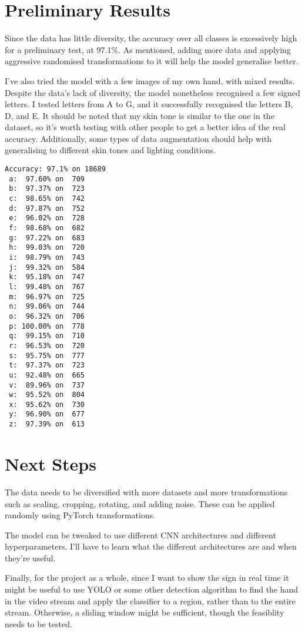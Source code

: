 \documentclass[12pt]{article}
\begin{document}
\section{Preliminary Results}

Since the data has little diversity, the accuracy over all classes is
excessively high for a preliminary test, at 97.1\%. As mentioned, adding
more data and applying aggressive randomised transformations to it will
help the model generalise better.

I've also tried the model with a few images of my own hand, with mixed
results. Despite the data's lack of diversity, the model nonetheless
recognised a few signed letters. I tested letters from A to G, and it
successfully recognised the letters B, D, and E. It should be noted that
my skin tone is similar to the one in the dataset, so it's worth testing
with other people to get a better idea of the real accuracy.
Additionally, some types of data augmentation should help with
generalising to different skin tones and lighting conditions.

\begin{verbatim}
Accuracy: 97.1% on 18689
 a:  97.60% on  709
 b:  97.37% on  723
 c:  98.65% on  742
 d:  97.87% on  752
 e:  96.02% on  728
 f:  98.68% on  682
 g:  97.22% on  683
 h:  99.03% on  720
 i:  98.79% on  743
 j:  99.32% on  584
 k:  95.18% on  747
 l:  99.48% on  767
 m:  96.97% on  725
 n:  99.06% on  744
 o:  96.32% on  706
 p: 100.00% on  778
 q:  99.15% on  710
 r:  96.53% on  720
 s:  95.75% on  777
 t:  97.37% on  723
 u:  92.48% on  665
 v:  89.96% on  737
 w:  95.52% on  804
 x:  95.62% on  730
 y:  96.90% on  677
 z:  97.39% on  613
\end{verbatim}

\section{Next Steps}

The data needs to be diversified with more datasets and more
transformations such as scaling, cropping, rotating, and adding noise.
These can be applied randomly using PyTorch transformations.

The model can be tweaked to use different CNN architectures and
different hyperparameters. I'll have to learn what the different
architectures are and when they're useful.

Finally, for the project as a whole, since I want to show the sign in
real time it might be useful to use YOLO\cite{yolo} or some other
detection algorithm to find the hand in the video stream and apply the
classifier to a region, rather than to the entire stream. Otherwise, a
sliding window might be sufficient, though the feasiblity needs to be
tested.
\end{document}
